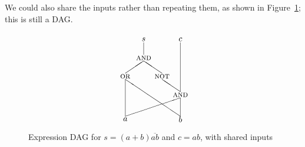 We could also share the inputs rather than repeating them, as shown in Figure~\ref{fig:exprdag2}; this is still a DAG.
\begin{figure}
\[ \setlength{\unitlength}{0.75pt}
\begin{picture}(110,140)
\put(10,0){\makebox(0,0){$a$}}
\put(100,0){\makebox(0,0){$b$}}
\put(10,70){\makebox(0,0){\textsc{or}}}
\put(10,5){\line(0,1){60}}
\put(100,5){\line(-3,2){90}}
\put(100,40){\makebox(0,0){\textsc{and}}}
\put(10,5){\line(3,1){90}}
\put(100,5){\line(0,1){30}}
\put(70,70){\makebox(0,0){\textsc{not}}}
\put(100,45){\line(-3,2){30}}
\put(40,100){\makebox(0,0){\textsc{and}}}
\put(10,75){\line(3,2){30}}
\put(70,75){\line(-3,2){30}}
\put(40,130){\makebox(0,0){$s$}}
\put(40,105){\line(0,1){20}}
\put(100,130){\makebox(0,0){$c$}}
\put(100,45){\line(0,1){80}}
\end{picture} \]
\caption{Expression DAG for $s=(a+b)\overline{ab}$ and $c=ab$, with shared inputs}
\label{fig:exprdag2}
\end{figure}

